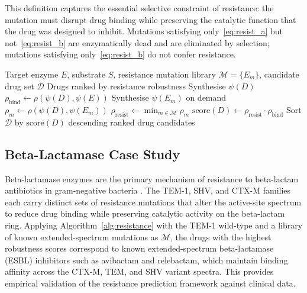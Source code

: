 \documentclass[twocolumn,11pt,a4paper]{article}
\theoremstyle{definition}
\theoremstyle{remark}
\begin{document}
This definition captures the essential selective constraint of resistance: the
mutation must disrupt drug binding while preserving the catalytic function that
the drug was designed to inhibit. Mutations satisfying only~\eqref{eq:resist_a}
but not~\eqref{eq:resist_b} are enzymatically dead and are eliminated by
selection; mutations satisfying only~\eqref{eq:resist_b} do not confer
resistance.

\begin{algorithm}
\caption{Resistance-robust drug candidate ranking}
\label{alg:resistance}
\begin{algorithmic}[1]
\Require Target enzyme $E$, substrate $S$, resistance mutation library
  $\mathcal{M} = \{E_m\}$, candidate drug set $\mathcal{D}$
\Ensure Drugs ranked by resistance robustness
  \State Synthesise $\psi(D)$
  \State $\rho_{\text{bind}} \gets \rho(\psi(D), \psi(E))$
    \State Synthesise $\psi(E_m)$ on demand
    \State $\rho_m \gets \rho(\psi(D), \psi(E_m))$
  \EndFor
  \State $\rho_{\text{resist}} \gets \min_{m \in \mathcal{M}} \rho_m$
  \State $\text{score}(D) \gets \rho_{\text{resist}} \cdot \rho_{\text{bind}}$
\EndFor
\State Sort $\mathcal{D}$ by $\text{score}(D)$ descending
\State \Return ranked drug candidates
\end{algorithmic}
\end{algorithm}

\subsection{Beta-Lactamase Case Study}

Beta-lactamase enzymes are the primary mechanism of resistance to beta-lactam
antibiotics in gram-negative bacteria \citep{levy2004}. The TEM-1, SHV, and
CTX-M families \citep{bush2010} each carry distinct sets of resistance mutations
that alter the active-site spectrum to reduce drug binding while preserving
catalytic activity on the beta-lactam ring. Applying Algorithm~\ref{alg:resistance}
with the TEM-1 wild-type and a library of known extended-spectrum mutations as
$\mathcal{M}$, the drugs with the highest robustness scores correspond to known
extended-spectrum beta-lactamase (ESBL) inhibitors such as avibactam and
relebactam, which maintain binding affinity across the CTX-M, TEM, and SHV
variant spectra. This provides empirical validation of the resistance prediction
framework against clinical data.
\end{document}

